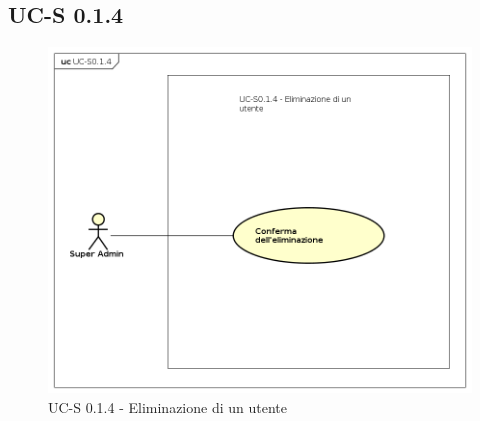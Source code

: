 \subsection{UC-S 0.1.4}
    \begin{figure}[H]
      \begin{center}
        \includegraphics[width=12cm]{res/img/UCSuperadmin/UCS0.1.4.png}
      \caption{UC-S 0.1.4 - Eliminazione di un utente}
      \end{center} 
    \end{figure}    
    
